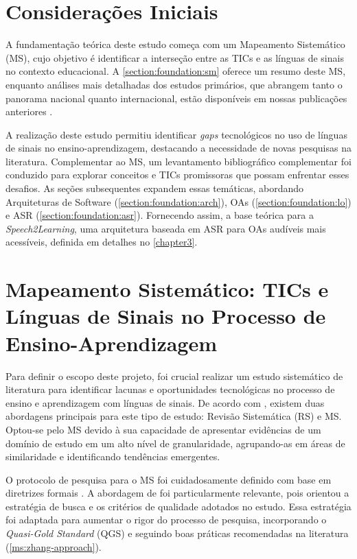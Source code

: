 \section{Considerações Iniciais}

A fundamentação teórica deste estudo começa com um Mapeamento Sistemático (MS), cujo objetivo é identificar a interseção entre as TICs e as línguas de sinais no contexto educacional. A \autoref{section:foundation:sm} oferece um resumo deste MS, enquanto análises mais detalhadas dos estudos primários, que abrangem tanto o panorama nacional quanto internacional, estão disponíveis em nossas publicações anteriores \cite{FalvoJr2020_FIE, FalvoJr2020_SBIE, FalvoJr2020_RENOTE}.

A realização deste estudo permitiu identificar \textit{gaps} tecnológicos no uso de línguas de sinais no ensino-aprendizagem, destacando a necessidade de novas pesquisas na literatura. Complementar ao MS, um levantamento bibliográfico complementar foi conduzido para explorar conceitos e TICs promissoras que possam enfrentar esses desafios. As seções subsequentes expandem essas temáticas, abordando Arquiteturas de Software (\autoref{section:foundation:arch}), OAs (\autoref{section:foundation:lo}) e ASR (\autoref{section:foundation:asr}). Fornecendo assim, a base teórica para a \textit{Speech2Learning}, uma arquitetura baseada em ASR para OAs audíveis mais acessíveis, definida em detalhes no \autoref{chapter3}.

\section{Mapeamento Sistemático: TICs e Línguas de Sinais no Processo de Ensino-Aprendizagem}
\label{section:foundation:sm}

Para definir o escopo deste projeto, foi crucial realizar um estudo sistemático de literatura para identificar lacunas e oportunidades tecnológicas no processo de ensino e aprendizagem com línguas de sinais. De acordo com , existem duas abordagens principais para este tipo de estudo: Revisão Sistemática (RS) e MS. Optou-se pelo MS devido à sua capacidade de apresentar evidências de um domínio de estudo em um alto nível de granularidade, agrupando-as em áreas de similaridade e identificando tendências emergentes.

O protocolo de pesquisa para o MS foi cuidadosamente definido com base em diretrizes formais  \cite{Kitchenham2007, Zhang2011, Petersen2015}. A abordagem de  foi particularmente relevante, pois orientou a estratégia de busca e os critérios de qualidade adotados no estudo. Essa estratégia foi adaptada para aumentar o rigor do processo de pesquisa, incorporando o \textit{Quasi-Gold Standard} (QGS) e seguindo boas práticas recomendadas na literatura (\autoref{ms:zhang-approach}).

